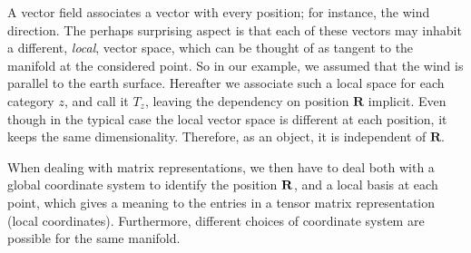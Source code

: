 \documentclass[nolinenum]{jfp}
\begin{document}
A vector field associates a vector with every
position; for instance, the wind
direction.  The perhaps surprising aspect is that each of these vectors
may inhabit a different, \emph{local}, vector space, which can be
thought of as tangent to the manifold at the considered point.
So in our example, we assumed that the wind is parallel to the earth surface.
Hereafter we
associate such a local space for each category \(z\), and call it \(T_{z}\),
leaving the dependency on position \(\mathbf R\) implicit.
Even though in the typical case the
local vector space is different at each position, it keeps the same
dimensionality. Therefore, as an object, it is independent of \(\mathbf R\).

When dealing with matrix representations, we then have to deal both
with a global coordinate system to identify the position \(\bf R\), and a local
basis at each point, which gives a meaning to the entries in a tensor
matrix representation (local coordinates).  Furthermore, different
choices of coordinate system are possible for the same manifold.
\end{document}
